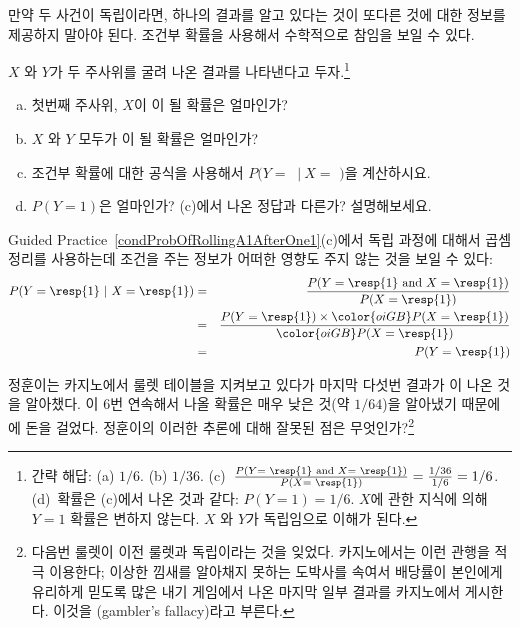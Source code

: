 만약 두 사건이 독립이라면, 하나의 결과를 알고 있다는 것이 또다른 것에 대한 정보를 제공하지 말아야 된다. 조건부 확률을 사용해서 수학적으로 참임을 보일 수 있다.

\begin{exercise} \label{condProbOfRollingA1AfterOne1}
$X$ 와 $Y$가 두 주사위를 굴려 나온 결과를 나타낸다고 두자.\footnote{간략 해답: (a) $1/6$. (b) $1/36$. (c)~$\frac{P(Y = \text{ \resp{1} and }X=\text{ \resp{1}})}{P(X=\text{ \resp{1}})} = \frac{1/36}{1/6} = 1/6$. 
(d)~확률은 (c)에서 나온 것과 같다: $P(Y=1)=1/6$. $X$에 관한 지식에 의해 $Y=1$ 확률은 변하지 않는다. $X$ 와 $Y$가 독립임으로 이해가 된다.}
\begin{enumerate}[(a)]
\item 첫번째 주사위, $X$이 이 될 확률은 얼마인가?
\item $X$ 와 $Y$ 모두가 이 될 확률은 얼마인가?
\item 조건부 확률에 대한 공식을 사용해서 $P(Y =$ $\ |\ X = $ $)$을 계산하시요.
\item $P(Y=1)$은 얼마인가? (c)에서 나온 정답과 다른가? 설명해보세요.
\end{enumerate}
\end{exercise}

\textC{\newpage}

Guided Practice~\ref{condProbOfRollingA1AfterOne1}(c)에서 독립 과정에 대해서 곱셈정리를 사용하는데 조건을 주는 정보가 어떠한 영향도 주지 않는 것을 보일 수 있다:
\begin{eqnarray*}
P(Y=\text{\resp{1}}\ |\ X=\text{\resp{1}})
	&=& \frac{P(Y=\text{\resp{1} and }X=\text{\resp{1}})}{P(X=\text{\resp{1}})} \\
	&=& \frac{P(Y=\text{\resp{1}})\times \color{oiGB}P(X=\text{\resp{1}})}{\color{oiGB}P(X=\text{\resp{1}})} \\
	&=& P(Y=\text{\resp{1}}) \\
\end{eqnarray*}

\begin{exercise}
정훈이는 카지노에서 룰렛 테이블을 지켜보고 있다가 마지막 다섯번 결과가 이 나온 것을 알아챘다. 이 6번 연속해서 나올 확률은 매우 낮은 것(약 $1/64$)을 알아냈기 때문에 에 돈을 걸었다. 정훈이의 이러한 추론에 대해 잘못된 점은 무엇인가?\footnote{다음번 룰렛이 이전 룰렛과 독립이라는 것을 잊었다. 카지노에서는 이런 관행을 적극 이용한다; 
이상한 낌새를 알아채지 못하는 도박사를 속여서 배당률이 본인에게 유리하게 믿도록 많은 내기 게임에서 나온 마지막 일부 결과를 카지노에서 게시한다. 이것을 (gambler's fallacy)라고 부른다.}
\end{exercise}


